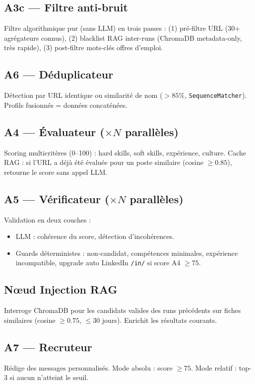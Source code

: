 \documentclass[12pt,a4paper]{report}
\begin{document}
\subsection{A3c --- Filtre anti-bruit}
Filtre algorithmique pur (sans LLM) en trois passes :
(1) pré-filtre URL (30+ agrégateurs connus),
(2) blacklist RAG inter-runs (ChromaDB metadata-only, très rapide),
(3) post-filtre mots-clés offres d'emploi.

\subsection{A6 --- Déduplicateur}
Détection par URL identique ou similarité de nom ($>85\%$,
\texttt{SequenceMatcher}). Profils fusionnés = données concaténées.

\subsection{A4 --- Évaluateur ($\times N$ parallèles)}
Scoring multicritères (0--100) : hard skills, soft skills, expérience, culture.
Cache RAG : si l'URL a déjà été évaluée pour un poste similaire (cosine $\geq 0.85$),
retourne le score sans appel LLM.

\subsection{A5 --- Vérificateur ($\times N$ parallèles)}
Validation en deux couches :
\begin{itemize}
  \item LLM : cohérence du score, détection d'incohérences.
  \item Guards déterministes : non-candidat, compétences minimales, expérience
        incompatible, upgrade auto LinkedIn \texttt{/in/} si score A4 $\geq 75$.
\end{itemize}

\subsection{Nœud Injection RAG}
Interroge ChromaDB pour les candidats valides des runs précédents sur fiches
similaires (cosine $\geq 0.75$, $\leq 30$ jours). Enrichit les résultats courants.

\subsection{A7 --- Recruteur}
Rédige des messages personnalisés. Mode absolu : score $\geq 75$.
Mode relatif : top-3 si aucun n'atteint le seuil.
\end{document}
